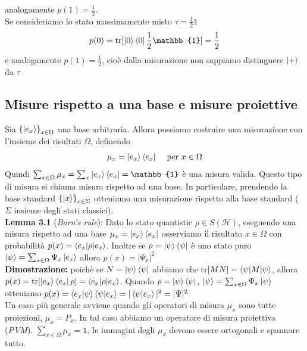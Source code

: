 \documentclass{report}
\begin{document}
analogamente $p(1) = \frac{1}{2}$.
\\Se consideriamo lo stato massimamente misto $\tau = \frac{1}{2}\mathbb{1}$
$$p(0)=\text{tr}[\ket{0}\bra{0}\frac{1}{2}\mathbb{1}] = \frac{1}{2}$$
e analogamente $p(1) = \frac{1}{2}$, cioè dalla misurazione non sappiamo distinguere $\ket{+}$ da $\tau$
\subsection{Misure rispetto a una base e misure proiettive}
Sia $\left\{\ket{e_x} \right\}_{x\in \Omega}$ una base arbitraria. Allora possiamo costruire una misurazione con l'insieme dei risultati $\Omega$, definendo
$$
    \mu_x = \ket{e_x}\bra{e_x} \hspace{0.3cm}\text{ per } x \in \Omega
$$
Quindi $\sum_{x\in\Omega}\mu_x = \sum_x \ket{e_x}\bra{e_x} = \mathbb{1}$ è una misura valida. Questo tipo di misura si chiama misura rispetto ad una base. In particolare, prendendo la base standard $\left\{ \ket{x} \right\}_{x\in\Sigma}$ otteniamo una misurazione rispetto alla base standard ($\Sigma$ insieme degli stati classici).
\medskip
\\ \textbf{Lemma 3.1} (\textit{Born's rule}): Dato lo stato quantistic $\rho \in S(\mathcal{H})$, eseguendo una misura rispetto ad una base $\mu_x=\ket{e_x}\bra{e_x}$ osserviamo il risultato $x\in\Omega$ con probabilità $p(x)=\braket{e_x|\rho|e_x}$. Inoltre se $\rho = \ket{\psi}\bra{\psi}$ è uno stato puro $\ket{\psi}= \sum_{x\in\Omega}\Psi_x\ket{e_x}$ allora $p(x)=|\Psi_x|^2$
\medskip
\\ \textbf{Dimostrazione:} poichè se $N = \ket{\psi}\bra{\psi}$ abbiamo che  tr$[MN]=\braket{\psi|M|\psi}$, allora $p(x)= \text{tr}[\ket{e_x}\bra{e_x}\rho]=\braket{e_x|\rho|e_x}$. Quando $\rho = \ket{\psi}\bra{\psi}$, $\ket{\psi} = \sum_{x\in\Omega}\Psi_x\ket{\psi}$ otteniamo $p(x)=\braket{e_x|\psi} \braket{\psi|e_x}= |\braket{\psi|e_x}|^2=|\Psi|^2$
\medskip
\\Un caso più generale avviene quando gli operatori di misura $\mu_x$ sono tutte proiezioni, $\mu_x=P_x$. In tal caso abbiamo un operatore di misura proiettiva (\textit{PVM}). $\sum_{x\in\Omega}\mu_x = \mathbb{1}$, le immagini degli $\mu_x$ devono essere ortogonali e spannare tutto.
\end{document}
